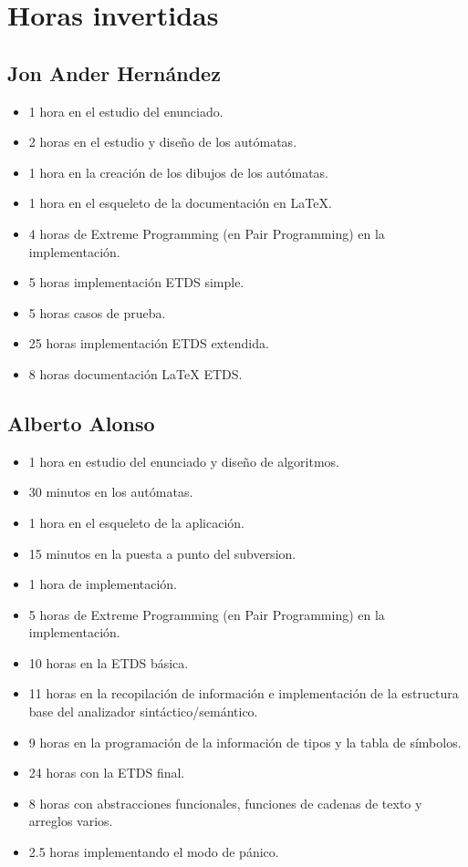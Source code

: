 
\chapter{Horas invertidas}

    \section{Jon Ander Hernández}
    
        \begin{itemize}
            \item 1 hora en el estudio del enunciado.
            \item 2 horas en el estudio y diseño de los autómatas.
            \item 1 hora en la creación de los dibujos de los autómatas.
            \item 1 hora en el esqueleto de la documentación en \LaTeX.
            \item 4 horas de Extreme Programming (en Pair Programming) en la implementación.
            \item 5 horas implementación ETDS simple.
            \item 5 horas casos de prueba.
            \item 25 horas implementación ETDS extendida.
            \item 8 horas documentación LaTeX ETDS.
         \end{itemize}
    
    \section{Alberto Alonso}
    
        \begin{itemize}
            \item 1 hora en estudio del enunciado y diseño de algoritmos.
            \item 30 minutos en los autómatas.
            \item 1 hora en el esqueleto de la aplicación.
            \item 15 minutos en la puesta a punto del subversion.
            \item 1 hora de implementación.
            \item 5 horas de Extreme Programming (en Pair Programming) en la implementación.
			\item 10 horas en la ETDS básica.
			\item 11 horas en la recopilación de información e implementación de la estructura base del analizador sintáctico/semántico.
			\item 9 horas en la programación de la información de tipos y la tabla de símbolos.
			\item 24 horas con la ETDS final.
			\item 8 horas con abstracciones funcionales, funciones de cadenas de texto y arreglos varios.
			\item 2.5 horas implementando el modo de pánico.
        \end{itemize}
    
